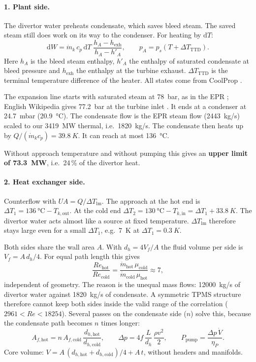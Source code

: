 \documentclass[10pt,a4paper]{article}
\begin{document}
\paragraph{1. Plant side.} The divertor water preheats condensate, which saves bleed steam. The saved steam still
does work on its way to the condenser. For heating by $\mathrm{d}T$:
\[
\mathrm{d}W = \dot m_k\,c_p\,\mathrm{d}T\;\frac{h_A - h_\text{exh}}{h_A - h'_A},\qquad
p_A = p_s(T + \Delta T_\text{TTD}).
\]
Here $h_A$ is the bleed steam enthalpy, $h'_A$ the enthalpy of saturated condensate at bleed pressure and
$h_\text{exh}$ the enthalpy at the turbine exhaust. $\Delta T_\text{TTD}$ is the terminal temperature difference
of the heater. All states come from CoolProp \cite{coolprop}.

The expansion line starts with saturated steam at \SI{78}{bar}, as in the EPR \cite{epr_de}; English Wikipedia
gives \SI{77.2}{bar} at the turbine inlet \cite{epr_en}. It ends at a condenser at \SI{24.7}{mbar}
(\SI{20.9}{\celsius}). The condensate flow is the EPR steam flow (\SI{2443}{kg/s}) scaled to our \SI{3419}{MW}
thermal, i.e.\ \SI{1820}{kg/s}. The condensate then heats up by $Q/(\dot m_k c_p) = \SI{39.8}{K}$. It can reach
at most \SI{136}{\celsius}.

Without approach temperature and without pumping this gives an \textbf{upper limit of \SI{73.3}{MW}}, i.e.\ 24\,\%
of the divertor heat.

\paragraph{2. Heat exchanger side.} Counterflow with $UA = Q/\Delta T_\text{lm}$. The approach at the hot end is
$\Delta T_1 = \SI{136}{\celsius} - T_{k,\text{out}}$. At the cold end
$\Delta T_2 = \SI{130}{\celsius} - T_{k,\text{in}} = \Delta T_1 + \SI{33.8}{K}$. The divertor water acts almost like a
source at fixed temperature. $\Delta T_\text{lm}$ therefore stays large even for a small $\Delta T_1$, e.g.\
\SI{7}{K} at $\Delta T_1 = \SI{0.3}{K}$.

Both sides share the wall area $A$. With $d_h = 4V_f/A$ the fluid volume per side is $V_f = A\,d_h/4$. For equal
path length this gives
\[
\frac{\mathit{Re}_\text{hot}}{\mathit{Re}_\text{cold}} = \frac{\dot m_\text{hot}\,\mu_\text{cold}}{\dot m_\text{cold}\,\mu_\text{hot}} \approx 7,
\]
independent of geometry. The reason is the unequal mass flows: \SI{12000}{kg/s} of divertor water against
\SI{1820}{kg/s} of condensate. A symmetric TPMS structure therefore cannot keep both sides inside the valid range
of the correlation ($2961 < \mathit{Re} < 18254$). Several passes on the condensate side ($n$) solve this, because
the condensate path becomes $n$ times longer:
\[
A_{f,\text{hot}} = n\,A_{f,\text{cold}}\,\frac{d_{h,\text{hot}}}{d_{h,\text{cold}}},\qquad
\Delta p = 4f\,\frac{L}{d_h}\,\frac{\rho v^2}{2},\qquad P_\text{pump} = \frac{\Delta p\,\dot V}{\eta_P}.
\]
Core volume: $V = A\,(d_{h,\text{hot}} + d_{h,\text{cold}})/4 + A\,t$, without headers and manifolds.
\end{document}
